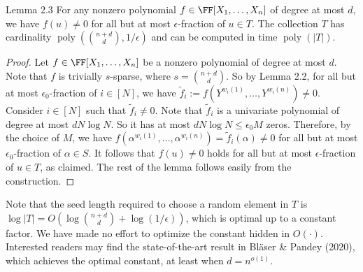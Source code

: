 \begin{result}{Lemma 2.3}
For any nonzero polynomial $f\in\FF[X_1,\ldots,X_n]$ of degree at most $d$, we have $f(u)\ne0$ for all but at most $\epsilon$-fraction of $u\in T$. The collection $T$ has cardinality $\operatorname{poly}(\binom{n+d}{d},1/\epsilon)$ and can be computed in time $\operatorname{poly}(|T|)$.
\end{result}
\begin{proof}
Let $f\in\FF[X_1,\ldots,X_n]$ be a nonzero polynomial of degree at most $d$. Note that $f$ is trivially $s$-sparse, where $s=\binom{n+d}{d}$. So by Lemma 2.2, for all but at most $\epsilon_0$-fraction of $i\in[N]$, we have $\widetilde f_i:=f(Y^{w_i(1)},\ldots,Y^{w_i(n)})\ne0$. Consider $i\in[N]$ such that $\widetilde f_i\ne0$. Note that $\widetilde f_i$ is a univariate polynomial of degree at most $dN\log N$. So it has at most $dN\log N\le\epsilon_0M$ zeros. Therefore, by the choice of $M$, we have $f(\alpha^{w_i(1)},\ldots,\alpha^{w_i(n)})=\widetilde f_i(\alpha)\ne0$ for all but at most $\epsilon_0$-fraction of $\alpha\in S$. It follows that $f(u)\ne0$ holds for all but at most $\epsilon$-fraction of $u\in T$, as claimed. The rest of the lemma follows easily from the construction.
\end{proof}
Note that the seed length required to choose a random element in $T$ is $\log|T|=O(\log\binom{n+d}{d}+\log(1/\epsilon))$, which is optimal up to a constant factor. We have made no effort to optimize the constant hidden in $O(\cdot)$. Interested readers may find the state-of-the-art result in Bl\"aser \& Pandey (2020), which achieves the optimal constant, at least when $d=n^{o(1)}$.
